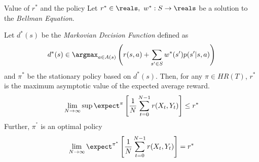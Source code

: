\documentclass[11pt,a4paper]{article}
\begin{document}
  \begin{theorem}{Value of $r^*$ and the policy}
    Let $r^*\in\reals,\ w^*:S\to\reals$ be a solution to the \textit{Bellman Equation}.
    \par Let $d^*(s)$ be the \textit{Markovian Decision Function} defined as
    \[ d^*(s)\in\argmax_{a\in A(s)}\left(r(s,a)+\sum_{s'\in S}w^*(s')p(s'|s,a)\right) \]
    and $\pi^*$ be the stationary policy based on $d^*(s)$. Then, for any $\pi\in HR(T)$, $r^*$ is the maximum asymptotic value of the expected average reward.
    \[ \lim_{N\to\infty}\sup\expect^\pi\left[\frac1N\sum_{t=0}^{N-1}r(X_t,Y_t)\right]\leq r^* \]
    Further, $\pi^^*$ is an optimal policy
    \[ \lim_{N\to\infty}\expect^{\pi^*}\left[\frac1N\sum_{t=0}^{N-1}r(X_t,Y_t)\right]=r^* \]
  \end{theorem}
\end{document}
